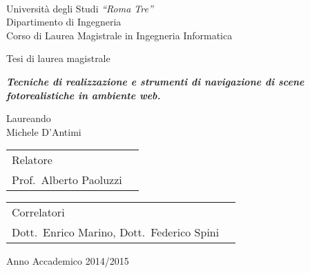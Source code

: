 \baselineskip=12mm
\thispagestyle{empty}

\begin{figure}
\begin{center}
~~\centerline {}
\end{center}
\end{figure}

\vskip 1.40cm

\begin{center}
\large
Università degli Studi \textit{``Roma Tre''}\\
Dipartimento di Ingegneria\\
Corso di Laurea Magistrale in Ingegneria Informatica\\
\end{center}

\vskip 1cm \Large

\begin{center}
Tesi di laurea magistrale
\end{center}

\vskip 1cm \baselineskip=10mm

\begin{center}
\textbf{{\em Tecniche di realizzazione e strumenti di navigazione di scene fotorealistiche in ambiente web.}}\\
\end{center}

\vskip 1cm

\begin{center}
Laureando\\
{Michele D'Antimi}\\
\end{center}

\vskip 1cm

\begin{center}
\large{
\begin{tabularx}{\textwidth}{>{\centering\arraybackslash}X >{\centering\arraybackslash}X}
  Relatore\\
  Prof.~Alberto Paoluzzi\\
\end{tabularx}
}
\end{center}

\begin{center}
\large{
\begin{tabularx}{\textwidth}{>{\centering\arraybackslash}X >{\centering\arraybackslash}X}
  Correlatori\\
  Dott.~Enrico Marino, Dott.~Federico Spini\\
\end{tabularx}
}
\end{center}

\vskip 1.5cm

\centerline{Anno Accademico 2014/2015}

\normalsize
